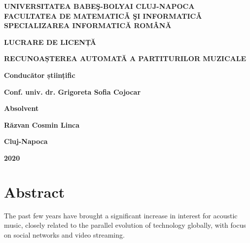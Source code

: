 \documentclass[a4paper,12pt]{report}
\begin{document}
\begin{titlepage}
    \begin{center}
        
        \vspace{0.5cm}
        \textbf{\Large UNIVERSITATEA BABEŞ-BOLYAI CLUJ-NAPOCA} \\
        \vspace{0.5cm}
        \textbf{\Large FACULTATEA DE MATEMATICǍ ŞI INFORMATICǍ} \\
        \vspace{0.5cm}
        \textbf{\Large SPECIALIZAREA INFORMATICĂ ROMÂNĂ}    
        
        \vspace{4cm}
        \textbf{\LARGE LUCRARE DE LICENȚĂ}
        
        \textbf{\Huge RECUNOAȘTEREA AUTOMATĂ A PARTITURILOR MUZICALE}
       
    \end{center}

    \vspace{5.5cm}
    \begin{flushleft}

        \textbf{\LARGE Conducător științific}

        \textbf{\LARGE Conf. univ. dr. Grigoreta Sofia Cojocar}
        
    \end{flushleft}
    
    \vspace{1cm}
    \begin{flushright}

        \textbf{\LARGE Absolvent}

        \textbf{\LARGE Răzvan Cosmin Linca}

    \end{flushright}

    \vspace{0.8cm}
    \begin{center}
        \textbf{\Large Cluj-Napoca}

        \textbf{\Large 2020}
    \end{center}

 \end{titlepage}
 \chapter*{Abstract}

The past few years have brought a significant increase in 
interest for acoustic music, 
closely related to the parallel evolution of technology globally, 
with focus on social networks and video streaming.
\end{document}
